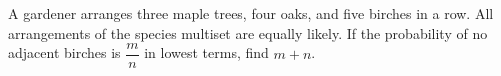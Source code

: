 A gardener arranges three maple trees, four oaks, and five birches in a row. All arrangements of the species multiset are equally likely. If the probability of no adjacent birches is $\dfrac{m}{n}$ in lowest terms, find $m+n$.
